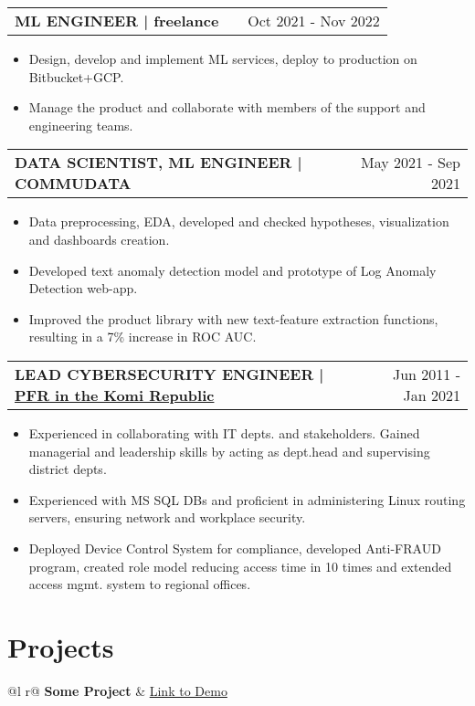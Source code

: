 \documentclass[a4paper,12pt]{article}
\makeatletter
\newenvironment{joblong}[2]
    {
    \begin{tabularx}{\linewidth}{@{}l X r@{}}
    \textbf{#1} & \hfill &  #2 \\[3.75pt]
    \end{tabularx}
    \begin{minipage}[t]{\linewidth}
    \begin{itemize}[nosep,after=\strut, leftmargin=1em, itemsep=3pt,label=--]
    }
    {
    \end{itemize}
    \end{minipage}    
    }
\makeatother
\begin{document}
\begin{joblong}{ML ENGINEER | freelance}{Oct 2021 - Nov 2022}
\item Design, develop and implement ML services, deploy to production on Bitbucket+GCP.
\item Manage the product and collaborate with members of the support and engineering teams.
\end{joblong}

\begin{joblong}{DATA SCIENTIST, ML ENGINEER | COMMUDATA}{May 2021 - Sep 2021}
\footnotesize NLP Startup. The idea was - determine an author's psychological state from his texts.\\
\item Data preprocessing, EDA, developed and checked hypotheses, visualization and dashboards creation.
\item Developed text anomaly detection model and prototype of Log Anomaly Detection web-app.
\item Improved the product library with new text-feature extraction functions,
resulting in a 7\% increase in ROC AUC.
\end{joblong}

\begin{joblong}{LEAD CYBERSECURITY ENGINEER | \href{www.pfrf.ru/ot_komi/}{PFR in the Komi Republic}}{Jun 2011 - Jan 2021}
\footnotesize Regional dept. Pension Fund of Russia (160+ employees in regional HQ, 22 district branches.\\
\item Experienced in collaborating with IT depts. and stakeholders. Gained managerial and leadership skills by acting as dept.head and supervising district depts.
\item Experienced with MS SQL DBs and proficient in administering Linux routing servers, ensuring network and workplace security.
\item Deployed Device Control System for compliance, developed Anti-FRAUD program, created role model reducing access time in 10 times and extended access mgmt. system to regional offices.
\end{joblong}


\section{Projects}

\begin{tabularx}{\linewidth}{ @{}l r@{} }
\textbf{Some Project} & \hfill \href{https://some-link.com}{Link to Demo} \\[3.75pt]
  \\
\end{tabularx}
\end{document}
